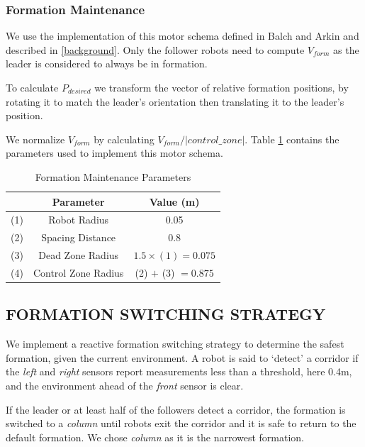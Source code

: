 \documentclass[letterpaper, 10 pt, conference]{ieeeconf}  %
\begin{document}
\subsubsection*{Formation Maintenance}

We use the implementation of this motor schema defined in Balch and Arkin and described in \ref{background}. Only the follower robots need to compute $V_{form}$ as the leader is considered to always be in formation.

To calculate $P_{desired}$ we transform the vector of relative formation positions, by rotating it to match the leader's orientation then translating it to the leader's position.

We normalize $V_{form}$ by calculating $V_{form}/|control\_zone|$. Table \ref{table_formation} contains the parameters used to implement this motor schema.

\begin{table}[h]
\begin{center}
\begin{tabular}{|c|c|c|}
\hline
& Parameter & Value (m) \\
\hline
(1) & Robot Radius             & 0.05 \\
(2) & Spacing Distance        & 0.8 \\
(3) & Dead Zone Radius      & $1.5 \times (1) = 0.075$ \\
(4) & Control Zone Radius    & (2) $+$ (3) $=0.875$ \\
\hline
\end{tabular}
\end{center}
\caption{Formation Maintenance Parameters}
\label{table_formation}
\end{table}

\subsection{FORMATION SWITCHING STRATEGY}

We implement a reactive formation switching strategy to determine the safest formation, given the current environment. A robot is said to `detect' a corridor if the \textit{left} and \textit{right} sensors report measurements less than a threshold, here 0.4m, and the environment ahead of the \textit{front} sensor is clear.

If the leader or at least half of the followers detect a corridor, the formation is switched to a \textit{column} until robots exit the corridor and it is safe to return to the default formation. We chose \textit{column} as it is the narrowest formation.
\end{document}
